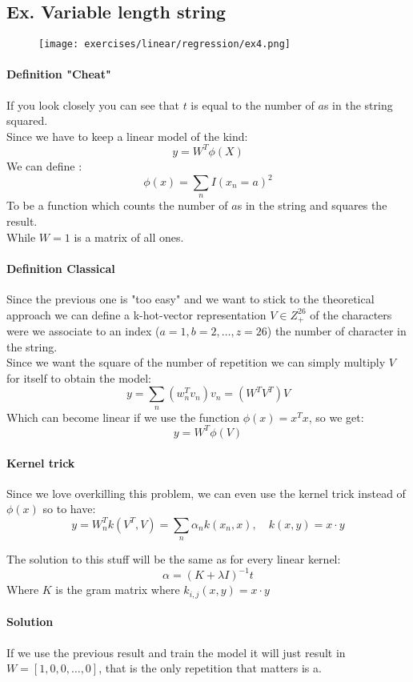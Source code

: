 \subsection{Ex. Variable length string}

\begin{figure}[H]
    \centering
    \texttt{[image: exercises/linear/regression/ex4.png]}
\end{figure}

\paragraph{Definition "Cheat"}
If you look closely you can see that $t$ is equal to the number of $a$s in the string squared.\\
Since we have to keep a linear model of the kind:
$$y=W^T\phi(X) $$ 
We can define :
$$\phi(x)=\sum_n I(x_n=a)^2$$
To be a function which counts the number of $a$s in the string and squares the result.\\
While $W=1$ is a matrix of all ones.

\paragraph{Definition Classical}
Since the previous one is "too easy" and we want to stick to the theoretical approach we can define a k-hot-vector representation $V \in Z_+^{26}$ of the characters were we associate to an index ($a=1,b=2,\dots, z=26$) the number of character in the string.\\
Since we want the square of the number of repetition we can simply multiply $V$ for itself to obtain the model:
$$y=\sum_n (w^T_n v_n) v_n=(W^T V^T)V$$
Which can become linear if we use the function $\phi(x)=x^Tx$, so we get:
$$y=W^T \phi(V)$$


\paragraph{Kernel trick}
Since we love overkilling this problem, we can even use the kernel trick instead of $\phi(x)$ so to have:
$$y=W^T_n k(V^T,V)=\sum_n \alpha_n k(x_n,x),\quad k(x,y)=x \cdot y$$

The solution to this stuff will be the same as for every linear kernel:
$$\alpha=(K+\lambda I)^{-1}t$$
Where $K$ is the gram matrix where $k_{i,j}(x,y)=x\cdot y$

\paragraph{Solution}
If we use the previous result and train the model it will just result in $W=[1,0,0,\dots,0]$, that is the only repetition that matters is a.

